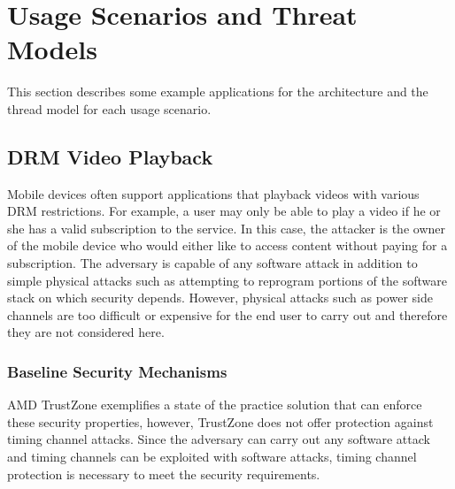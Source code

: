 \section{Usage Scenarios and Threat Models}

    This section describes some example applications for the architecture and 
    the thread model for each usage scenario.

    \subsection{DRM Video Playback}
    Mobile devices often support applications that playback videos with various 
    DRM restrictions. For example, a user may only be able to play a video if 
    he or she has a valid subscription to the service. In this case, the 
    attacker is the owner of the mobile device who would either like to access 
    content without paying for a subscription. The adversary is capable of any 
    software attack in addition to simple physical attacks such as attempting 
    to reprogram portions of the software stack on which security depends.  
    However, physical attacks such as power side channels are too difficult or 
    expensive for the end user to carry out and therefore they are not 
    considered here.

   
    \subsubsection{Baseline Security Mechanisms}
    AMD TrustZone \cite{trustzone} exemplifies a state of the practice solution 
    that can enforce these security properties, however, TrustZone does not 
    offer protection against timing channel attacks. Since the adversary can 
    carry out any software attack and timing channels can be exploited with 
    software attacks, timing channel protection is necessary to meet the 
    security requirements. 
    
